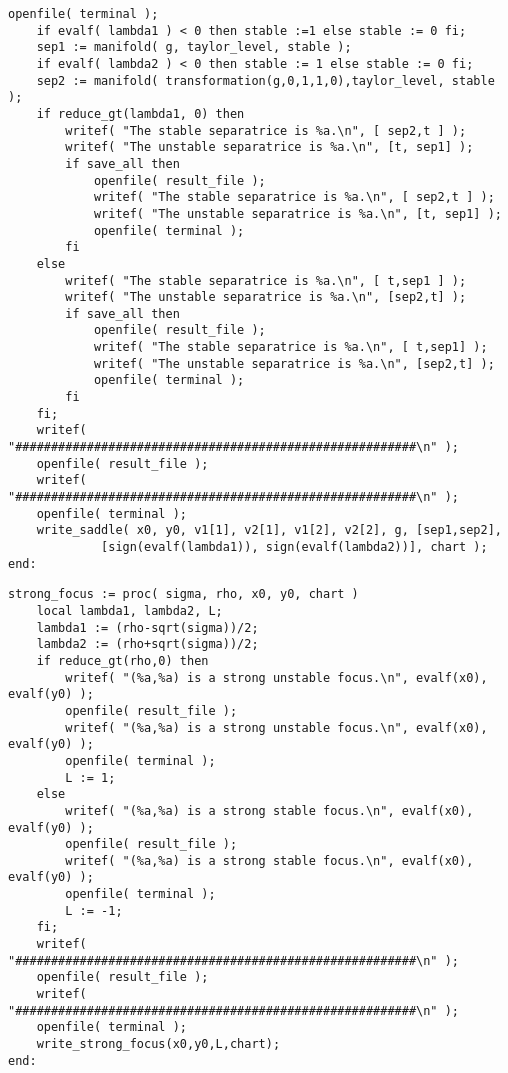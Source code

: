 \documentclass[a4paper,10pt]{article}
\begin{document}
\begin{lstlisting}[name=type]
    openfile( terminal );
    if evalf( lambda1 ) < 0 then stable :=1 else stable := 0 fi;
    sep1 := manifold( g, taylor_level, stable );
    if evalf( lambda2 ) < 0 then stable := 1 else stable := 0 fi;
    sep2 := manifold( transformation(g,0,1,1,0),taylor_level, stable );
    if reduce_gt(lambda1, 0) then
        writef( "The stable separatrice is %a.\n", [ sep2,t ] );
        writef( "The unstable separatrice is %a.\n", [t, sep1] );
        if save_all then
            openfile( result_file );
            writef( "The stable separatrice is %a.\n", [ sep2,t ] );
            writef( "The unstable separatrice is %a.\n", [t, sep1] );
            openfile( terminal );
        fi
    else
        writef( "The stable separatrice is %a.\n", [ t,sep1 ] );
        writef( "The unstable separatrice is %a.\n", [sep2,t] );
        if save_all then
            openfile( result_file );
            writef( "The stable separatrice is %a.\n", [ t,sep1] );
            writef( "The unstable separatrice is %a.\n", [sep2,t] );
            openfile( terminal );
        fi
    fi;
    writef( "########################################################\n" );
    openfile( result_file );
    writef( "########################################################\n" );
    openfile( terminal );
    write_saddle( x0, y0, v1[1], v2[1], v1[2], v2[2], g, [sep1,sep2],
             [sign(evalf(lambda1)), sign(evalf(lambda2))], chart );
end:
\end{lstlisting}

\begin{lstlisting}[name=type]
strong_focus := proc( sigma, rho, x0, y0, chart )
    local lambda1, lambda2, L;
    lambda1 := (rho-sqrt(sigma))/2;
    lambda2 := (rho+sqrt(sigma))/2;
    if reduce_gt(rho,0) then
        writef( "(%a,%a) is a strong unstable focus.\n", evalf(x0), evalf(y0) );
        openfile( result_file );
        writef( "(%a,%a) is a strong unstable focus.\n", evalf(x0), evalf(y0) );
        openfile( terminal );
        L := 1;
    else
        writef( "(%a,%a) is a strong stable focus.\n", evalf(x0), evalf(y0) );
        openfile( result_file );
        writef( "(%a,%a) is a strong stable focus.\n", evalf(x0), evalf(y0) );
        openfile( terminal );
        L := -1;
    fi;
    writef( "########################################################\n" );
    openfile( result_file );
    writef( "########################################################\n" );
    openfile( terminal );
    write_strong_focus(x0,y0,L,chart);
end:
\end{lstlisting}
\end{document}
